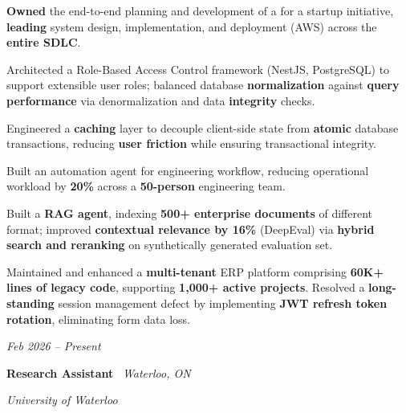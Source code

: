     \vspace{0.10 cm}
    \begin{onecolentry}
        \begin{highlights}
    
    \item \textbf{Owned} the end-to-end planning and development of a  for a startup initiative, \textbf{leading} system design, implementation, and deployment (AWS) across the \textbf{entire SDLC}.

    \item Architected a Role-Based Access Control framework (NestJS, PostgreSQL) to support extensible user roles; balanced database \textbf{normalization} against \textbf{query performance} via denormalization and data \textbf{integrity} checks.

    \item Engineered a \textbf{caching} layer to decouple client-side state from \textbf{atomic} database transactions, reducing \textbf{user friction} while ensuring transactional integrity.

    \item Built an automation agent for engineering workflow, reducing operational workload by \textbf{20\%} across a \textbf{50-person} engineering team.

    \item Built a \textbf{RAG agent}, indexing \textbf{500+ enterprise documents} of different format; improved \textbf{contextual relevance by 16\%} (DeepEval) via \textbf{hybrid search and reranking} on synthetically generated evaluation set.

    \item Maintained and enhanced a \textbf{multi-tenant} ERP platform comprising \textbf{60K+ lines of legacy code}, supporting \textbf{1,000+ active projects}. Resolved a \textbf{long-standing} session management defect by implementing \textbf{JWT refresh token rotation}, eliminating form data loss.

        
        \end{highlights}
    \end{onecolentry}
\vspace{0.2cm}    \begin{twocolentry}{

    \textit{Feb 2026 -- Present}}
        \textbf{Research Assistant} \textbar\ \textit{Waterloo, ON}
        
        \textit{University of Waterloo}
    \end{twocolentry}

